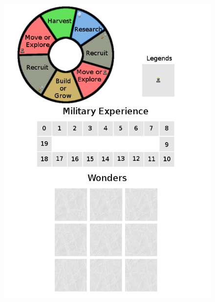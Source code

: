 \documentclass{article}
\begin{document}
\begin{figure}[!htb]
  \includegraphics[scale=1]{../rules/png/doe_central_board.png}
  \caption{}
  \label{fig:game_board}
\end{figure}
\end{document}
